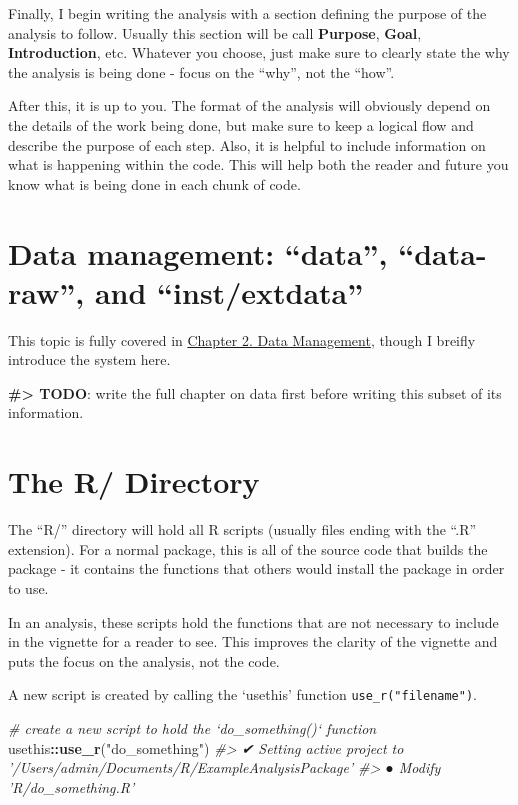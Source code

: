 \documentclass[]{book}
\newenvironment{Shaded}{\begin{snugshade}}{\end{snugshade}}
\newcommand{\CommentTok}[1]{\textcolor[rgb]{0.56,0.35,0.01}{\textit{#1}}}
\newcommand{\KeywordTok}[1]{\textcolor[rgb]{0.13,0.29,0.53}{\textbf{#1}}}
\newcommand{\NormalTok}[1]{#1}
\newcommand{\OperatorTok}[1]{\textcolor[rgb]{0.81,0.36,0.00}{\textbf{#1}}}
\newcommand{\StringTok}[1]{\textcolor[rgb]{0.31,0.60,0.02}{#1}}
\begin{document}
Finally, I begin writing the analysis with a section defining the purpose of the analysis to follow. Usually this section will be call \textbf{Purpose}, \textbf{Goal}, \textbf{Introduction}, etc. Whatever you choose, just make sure to clearly state the why the analysis is being done - focus on the ``why'', not the ``how''.

After this, it is up to you. The format of the analysis will obviously depend on the details of the work being done, but make sure to keep a logical flow and describe the purpose of each step. Also, it is helpful to include information on what is happening within the code. This will help both the reader and future you know what is being done in each chunk of code.

\hypertarget{data-management-data-data-raw-and-instextdata}{%
\section{Data management: ``data'', ``data-raw'', and ``inst/extdata''}\label{data-management-data-data-raw-and-instextdata}}

This topic is fully covered in \protect\hyperlink{data-management}{Chapter 2. Data Management}, though I breifly introduce the system here.

\textbf{\#\textgreater{} TODO}: write the full chapter on data first before writing this subset of its information.

\hypertarget{the-r-directory}{%
\section{The R/ Directory}\label{the-r-directory}}

The ``R/'' directory will hold all R scripts (usually files ending with the ``.R'' extension). For a normal package, this is all of the source code that builds the package - it contains the functions that others would install the package in order to use.

In an analysis, these scripts hold the functions that are not necessary to include in the vignette for a reader to see. This improves the clarity of the vignette and puts the focus on the analysis, not the code.

A new script is created by calling the `usethis' function \texttt{use\_r("filename")}.

\begin{Shaded}
\begin{Highlighting}[]
\CommentTok{# create a new script to hold the `do_something()` function}
\NormalTok{usethis}\OperatorTok{::}\KeywordTok{use_r}\NormalTok{(}\StringTok{"do_something"}\NormalTok{)}
\CommentTok{#> ✔ Setting active project to '/Users/admin/Documents/R/ExampleAnalysisPackage'}
\CommentTok{#> ● Modify 'R/do_something.R'}
\end{Highlighting}
\end{Shaded}
\end{document}
